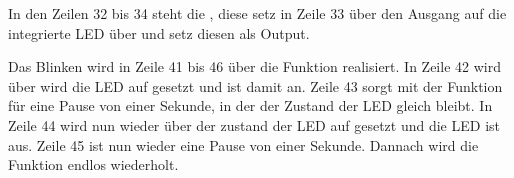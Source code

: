 
In den Zeilen 32 bis 34 steht die , diese setz in Zeile 33 über  den Ausgang auf die integrierte LED über  und setz diesen als Output.

Das Blinken wird in Zeile 41 bis 46 über die  Funktion realisiert.
In Zeile 42 wird über  wird die LED auf  gesetzt und ist damit an.
Zeile 43 sorgt mit der Funktion  für eine Pause von einer Sekunde, in der der Zustand der LED gleich bleibt.
In Zeile 44 wird nun wieder über  der zustand der LED auf  gesetzt und die LED ist aus.
Zeile 45 ist nun wieder eine Pause von einer Sekunde. Dannach wird die  Funktion endlos wiederholt. 








